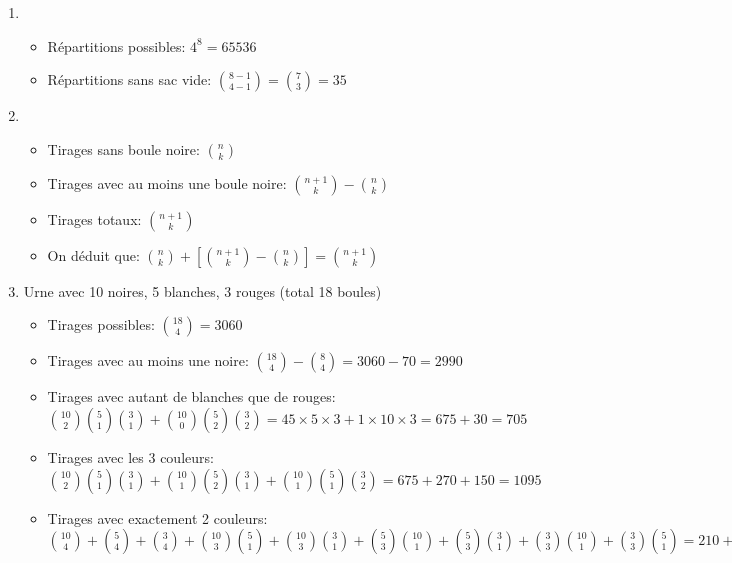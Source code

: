 \begin{enumerate}
    \item 
    \begin{itemize}
        \item Répartitions possibles: \(4^8 = 65536\)
        \item Répartitions sans sac vide: \(\binom{8-1}{4-1} = \binom{7}{3} = 35\)
    \end{itemize}
    
    \item 
    \begin{itemize}
        \item Tirages sans boule noire: \(\binom{n}{k}\)
        \item Tirages avec au moins une boule noire: \(\binom{n+1}{k} - \binom{n}{k}\)
        \item Tirages totaux: \(\binom{n+1}{k}\)
        \item On déduit que: \(\binom{n}{k} + \left[\binom{n+1}{k} - \binom{n}{k}\right] = \binom{n+1}{k}\)
    \end{itemize}
    
    \item Urne avec 10 noires, 5 blanches, 3 rouges (total 18 boules)
    \begin{itemize}
        \item Tirages possibles: \(\binom{18}{4} = 3060\)
        \item Tirages avec au moins une noire: \(\binom{18}{4} - \binom{8}{4} = 3060 - 70 = 2990\)
        \item Tirages avec autant de blanches que de rouges:\\
        \(\binom{10}{2}\binom{5}{1}\binom{3}{1} + \binom{10}{0}\binom{5}{2}\binom{3}{2} = 45 \times 5 \times 3 + 1 \times 10 \times 3 = 675 + 30 = 705\)
        \item Tirages avec les 3 couleurs:\\
        \(\binom{10}{2}\binom{5}{1}\binom{3}{1} + \binom{10}{1}\binom{5}{2}\binom{3}{1} + \binom{10}{1}\binom{5}{1}\binom{3}{2} = 675 + 270 + 150 = 1095\)
        \item Tirages avec exactement 2 couleurs:\\
        \(\binom{10}{4} + \binom{5}{4} + \binom{3}{4} + \binom{10}{3}\binom{5}{1} + \binom{10}{3}\binom{3}{1} + \binom{5}{3}\binom{10}{1} + \binom{5}{3}\binom{3}{1} + \binom{3}{3}\binom{10}{1} + \binom{3}{3}\binom{5}{1} = 210 + 5 + 0 + 1200 + 360 + 100 + 30 + 10 + 5 = 1920\)
    \end{itemize}
\end{enumerate}

